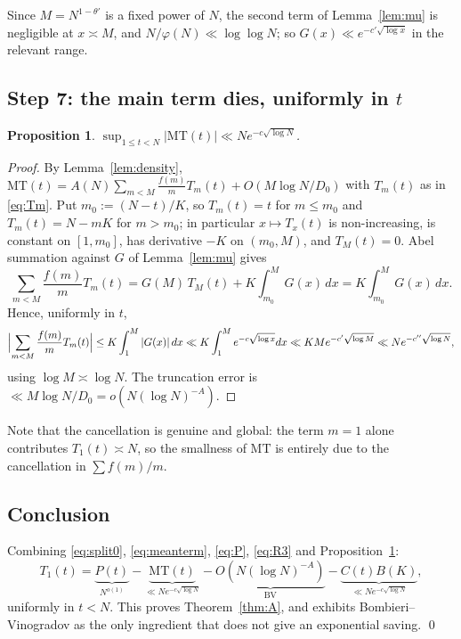 \documentclass[11pt,a4paper]{article}
\theoremstyle{plain}
\newtheorem{proposition}[theorem]{Proposition}
\theoremstyle{definition}
\begin{document}
Since $M=N^{1-\theta'}$ is a fixed power of $N$, the second term of
Lemma~\ref{lem:mu} is negligible at $x\asymp M$, and
$N/\varphi(N)\ll\log\log N$; so $G(x)\ll e^{-c'\sqrt{\log x}}$ in the
relevant range.

\subsection{Step 7: the main term dies, uniformly in $t$}

\begin{proposition}\label{prop:MT}
$\displaystyle \sup_{1\le t<N}|\mathrm{MT}(t)|\ll N e^{-c\sqrt{\log N}}$.
\end{proposition}

\begin{proof}
By Lemma~\ref{lem:density},
$\mathrm{MT}(t)=A(N)\sum_{m<M}\frac{f(m)}{m}T_m(t)+O(M\log N/D_0)$
with $T_m(t)$ as in \eqref{eq:Tm}. Put $m_0:=(N-t)/K$, so
$T_m(t)=t$ for $m\le m_0$ and $T_m(t)=N-mK$ for $m>m_0$; in particular
$x\mapsto T_x(t)$ is non-increasing, is constant on $[1,m_0]$, has
derivative $-K$ on $(m_0,M)$, and $T_M(t)=0$. Abel summation against
$G$ of Lemma~\ref{lem:mu} gives
\[
  \sum_{m<M}\frac{f(m)}{m}T_m(t)
  = G(M)\,T_M(t) + K\!\int_{m_0}^{M}\! G(x)\,dx
  = K\!\int_{m_0}^{M}\! G(x)\,dx .
\]
Hence, uniformly in $t$,
\[
  \Bigl|\sum_{m<M}\frac{f(m)}{m}T_m(t)\Bigr|
  \le K\int_{1}^{M}|G(x)|\,dx
  \ll K\int_1^M e^{-c\sqrt{\log x}}dx
  \ll KM e^{-c'\sqrt{\log M}} \ll N e^{-c''\sqrt{\log N}},
\]
using $\log M\asymp\log N$. The truncation error is
$\ll M\log N/D_0=o(N(\log N)^{-A})$.
\end{proof}

Note that the cancellation is genuine and global: the term $m=1$ alone
contributes $T_1(t)\asymp N$, so the smallness of $\mathrm{MT}$ is
entirely due to the cancellation in $\sum f(m)/m$.

\subsection{Conclusion}

Combining \eqref{eq:split0}, \eqref{eq:meanterm}, \eqref{eq:P},
\eqref{eq:R3} and Proposition~\ref{prop:MT}:
\[
  T_1(t) = \underbrace{P(t)}_{N^{o(1)}}
         - \underbrace{\mathrm{MT}(t)}_{\ll Ne^{-c\sqrt{\log N}}}
         - \underbrace{O\!\left(N(\log N)^{-A}\right)}_{\text{BV}}
         - \underbrace{C(t)B(K)}_{\ll Ne^{-c\sqrt{\log N}}},
\]
uniformly in $t<N$. This proves Theorem~\ref{thm:A}, and exhibits
Bombieri--Vinogradov as the only ingredient that does not give an
exponential saving. \qed
\end{document}
